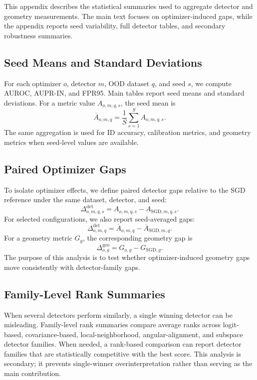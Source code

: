 This appendix describes the statistical summaries used to aggregate detector and
geometry measurements. The main text focuses on optimizer-induced gaps, while
the appendix reports seed variability, full detector tables, and secondary
robustness summaries.

\subsection{Seed Means and Standard Deviations}
\label{app:seed-means-std}

For each optimizer \(o\), detector \(m\), OOD dataset \(q\), and seed \(s\), we
compute AUROC, AUPR-IN, and FPR95. Main tables report seed means and standard
deviations. For a metric value \(A_{o,m,q,s}\), the seed mean is
\[
    \overline{A}_{o,m,q}
    =
    \frac{1}{S}\sum_{s=1}^{S}A_{o,m,q,s}.
\]
The same aggregation is used for ID accuracy, calibration metrics, and geometry
metrics when seed-level values are available.

\subsection{Paired Optimizer Gaps}
\label{app:paired-optimizer-gaps}

To isolate optimizer effects, we define paired detector gaps relative to the SGD
reference under the same dataset, detector, and seed:
\[
    \Delta^{\mathrm{det}}_{o,m,q,s}
    =
    A_{o,m,q,s}
    -
    A_{\mathrm{SGD},m,q,s}.
\]
For selected configurations, we also report seed-averaged gaps:
\[
    \Delta^{\mathrm{det}}_{o,m,q}
    =
    \overline{A}_{o,m,q}
    -
    \overline{A}_{\mathrm{SGD},m,q}.
\]
For a geometry metric \(G_g\), the corresponding geometry gap is
\[
    \Delta^{\mathrm{geo}}_{o,g}
    =
    G_{o,g}
    -
    G_{\mathrm{SGD},g}.
\]
The purpose of this analysis is to test whether optimizer-induced geometry gaps
move consistently with detector-family gaps.

\subsection{Family-Level Rank Summaries}
\label{app:family-rank-summaries}

When several detectors perform similarly, a single winning detector can be
misleading. Family-level rank summaries compare average ranks across
logit-based, covariance-based, local-neighborhood, angular-alignment, and
subspace detector families. When needed, a rank-based comparison can report
detector families that are statistically competitive with the best score. This
analysis is secondary; it prevents single-winner overinterpretation rather than
serving as the main contribution.

